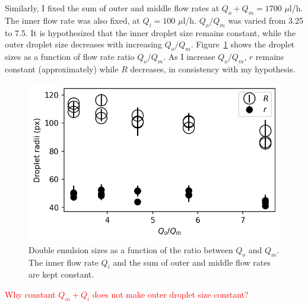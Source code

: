 \documentclass[onecolumn,aps, pre,amsmath,amssymb,longbibliography,12pt]{revtex4-2}
\begin{document}
Similarly, I fixed the sum of outer and middle flow rates at $Q_o+Q_m=1700$ $\mu$l/h.
The inner flow rate was also fixed, at $Q_i=100$ $\mu$l/h.
$Q_o/Q_m$ was varied from 3.25 to 7.5.
It is hypothesized that the inner droplet size remains constant, while the outer droplet size decreases with increasing $Q_o/Q_m$.
Figure~\ref{fig:fix-om-sum} shows the droplet sizes as a function of flow rate ratio $Q_o/Q_m$.
As I increase $Q_o/Q_m$, $r$ remains constant (approximately) while $R$ decreases, in consistency with my hypothesis.

\begin{figure}[h]
  \includegraphics{fix-om-sum.png}
  \caption{Double emulsion sizes as a function of the ratio between $Q_o$ and $Q_m$.
  The inner flow rate $Q_i$ and the sum of outer and middle flow rates are kept constant.}
  \label{fig:fix-om-sum}
\end{figure}

\textcolor{red}{Why constant $Q_m+Q_i$ does not make outer droplet size constant?}



\end{document}
